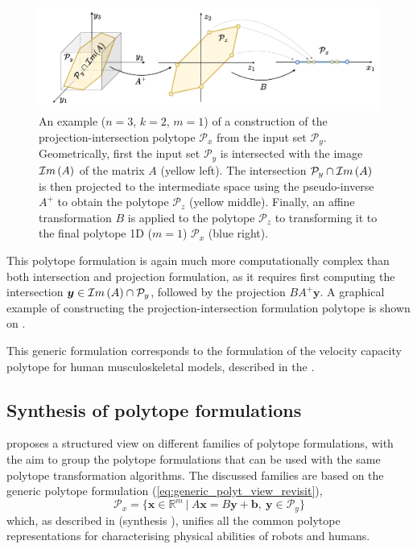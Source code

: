 \begin{figure}
    \centering
    \includegraphics[width=\linewidth]{Chapters/imgs/spec_proj_int.pdf}
    \caption{An example ($n=3$, $k=2$, $m=1$) of a construction of the projection-intersection polytope $\mathcal{P}_x$ from the input set $\mathcal{P}_y$. 
    Geometrically, first the input set $\mathcal{P}_y$ is intersected with the image $\mathcal{I}m\left(A\right)$ of the matrix $A$ (yellow left). The intersection $\mathcal{P}_y\cap\mathcal{I}m\left(A\right)$ is then projected to the intermediate space using the pseudo-inverse $A^+$ to obtain the polytope $\mathcal{P}_z$ (yellow middle). Finally, an affine transformation $B$ is applied to the polytope $\mathcal{P}_z$ to transforming it to the final polytope 1D ($m=1$) $\mathcal{P}_x$ (blue right).}
    \label{fig:proj_inter_spec}
\end{figure}
This polytope formulation is again much more computationally complex than both intersection and projection formulation, as it requires first computing the intersection $\bm{y} \in \mathcal{I}m\left(A\right)\cap\mathcal{P}_y$, followed by the projection $BA^{+}\bm{y}$. A graphical example of constructing the projection-intersection formulation polytope is shown on .

\begin{remark}
    This generic formulation corresponds to the formulation of the velocity capacity polytope for human musculoskeletal models, described in the .
\end{remark}


\subsection{Synthesis of polytope formulations}
\label{ch:which_metric_which_formulation}

 proposes a structured view on different families of polytope formulations, with the aim to group the polytope formulations that can be used with the same polytope transformation algorithms. The discussed families are based on the generic polytope formulation (\ref{eq:generic_polyt_view_revisit}), 
\begin{equation}
    \mathcal{P}_x = \{\bm{x}\in\mathbb{R}^m ~|~ A\bm{x}=B\bm{y} + \bm{b}, ~ \bm{y}\in\mathcal{P}_y\}
    \label{eq:generic_polyt_view_revisit4}
\end{equation}
which, as described in  (synthesis ), unifies all the common polytope representations for characterising physical abilities of robots and humans. 


